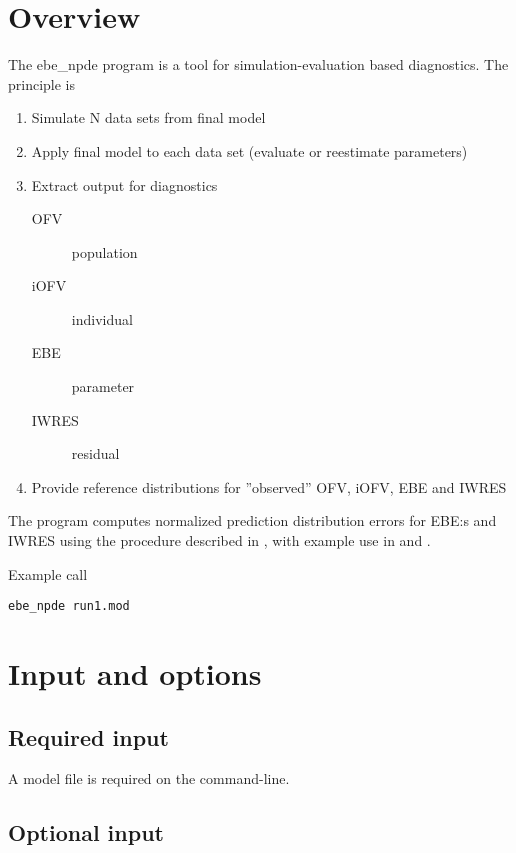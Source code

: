 



\maketitle
\newcommand{\guidetoolname}{ebe\_npde}


\section{Overview}

The ebe\_npde program is a tool for simulation-evaluation based diagnostics. The principle is 
\begin{enumerate}
\item Simulate N data sets from final model
\item Apply final model to each data set (evaluate or reestimate parameters)
\item Extract output for diagnostics
\begin{description}
\item[OFV] population
\item[iOFV] individual
\item[EBE] parameter
\item[IWRES] residual
\end{description}
\item Provide reference distributions for ”observed” OFV, iOFV, EBE and IWRES
\end{enumerate}
The program computes normalized prediction distribution errors for EBE:s and IWRES 
using the procedure described in \cite{Comets}, with example use in \cite{Keizer} and \cite{Largajolli}.

Example call
\begin{verbatim}
ebe_npde run1.mod
\end{verbatim}

\section{Input and options}

\subsection{Required input}

A model file is required on the command-line.

\subsection{Optional input}

